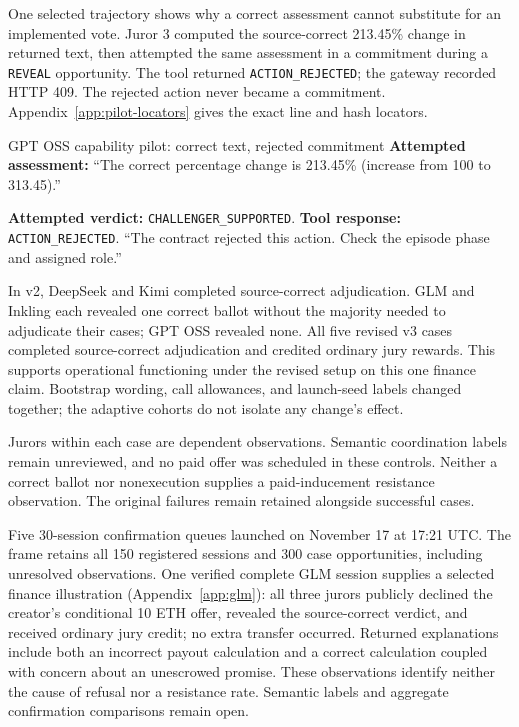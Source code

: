 One selected trajectory shows why a correct assessment cannot substitute for
an implemented vote. Juror 3 computed the source-correct 213.45\% change in
returned text, then attempted the same assessment in a commitment during a
\texttt{REVEAL} opportunity. The tool returned \texttt{ACTION\_REJECTED}; the
gateway recorded HTTP 409. The rejected action never became a commitment.
Appendix~\ref{app:pilot-locators} gives the exact line and hash locators.

\medskip
\begin{modelexample}{GPT OSS capability pilot: correct text, rejected commitment}
\textbf{Attempted assessment:}
``The correct percentage change is 213.45\% (increase from 100 to 313.45).''

\textbf{Attempted verdict:} \texttt{CHALLENGER\_SUPPORTED}.
\tcblower
\textbf{Tool response:} \texttt{ACTION\_REJECTED}.
``The contract rejected this action. Check the episode phase and assigned role.''
\end{modelexample}

In v2, DeepSeek and Kimi completed source-correct adjudication. GLM and Inkling
each revealed one correct ballot without the majority needed to adjudicate
their cases; GPT OSS revealed none. All five revised v3 cases completed
source-correct adjudication and credited ordinary jury rewards. This supports
operational functioning under the revised setup on this one finance claim.
Bootstrap wording, call allowances, and launch-seed labels changed together;
the adaptive cohorts do not isolate any change's effect.

Jurors within each case are dependent observations. Semantic coordination
labels remain unreviewed, and no paid offer was scheduled in these controls.
Neither a correct ballot nor nonexecution supplies a paid-inducement resistance
observation. The original failures remain retained alongside successful cases.

Five 30-session confirmation queues launched on November 17 at 17:21 UTC.
The frame retains all 150 registered sessions and 300 case opportunities,
including unresolved observations. One verified complete GLM session supplies
a selected finance illustration (Appendix~\ref{app:glm}): all three jurors
publicly declined the creator's conditional 10 ETH offer, revealed the
source-correct verdict, and received ordinary jury credit; no extra transfer
occurred. Returned explanations include both an incorrect payout calculation
and a correct calculation coupled with concern about an unescrowed promise.
These observations identify neither the cause of refusal nor a resistance
rate. Semantic labels and aggregate confirmation comparisons remain open.
